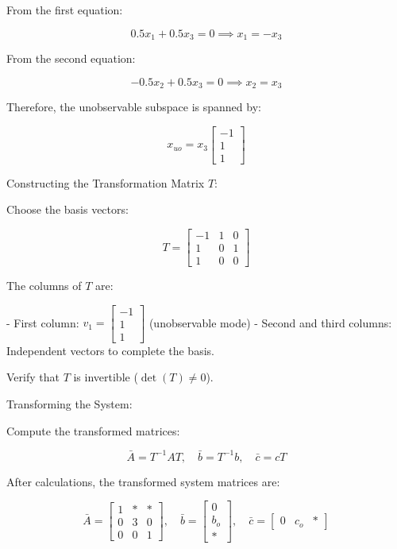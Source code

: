 \documentclass[12pt]{article}
\begin{document}
From the first equation:

\[
0.5 x_1 + 0.5 x_3 = 0 \implies x_1 = - x_3
\]

From the second equation:

\[
-0.5 x_2 + 0.5 x_3 = 0 \implies x_2 = x_3
\]

Therefore, the unobservable subspace is spanned by:

\[
x_{uo} = x_3 \begin{bmatrix} -1 \\ 1 \\ 1 \end{bmatrix}
\]

Constructing the Transformation Matrix \( T \):

Choose the basis vectors:

\[
T = \begin{bmatrix}
-1 & 1 & 0 \\
1  & 0 & 1 \\
1  & 0 & 0
\end{bmatrix}
\]

The columns of \( T \) are:

- First column: \( v_1 = \begin{bmatrix} -1 \\ 1 \\ 1 \end{bmatrix} \) (unobservable mode)
- Second and third columns: Independent vectors to complete the basis.

Verify that \( T \) is invertible (\( \det(T) \neq 0 \)).

Transforming the System:

Compute the transformed matrices:

\[
\bar{A} = T^{-1} A T, \quad \bar{b} = T^{-1} b, \quad \bar{c} = c T
\]

After calculations, the transformed system matrices are:

\[
\bar{A} = \begin{bmatrix}
1   & * & * \\
0   & 3 & 0 \\
0   & 0 & 1
\end{bmatrix}, \quad
\bar{b} = \begin{bmatrix}
0 \\ b_{o} \\ *
\end{bmatrix}, \quad
\bar{c} = \begin{bmatrix}
0 & c_{o} & *
\end{bmatrix}
\]
\end{document}
